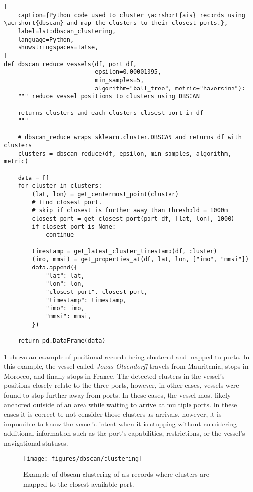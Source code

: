 \begin{lstlisting}[
    caption={Python code used to cluster \acrshort{ais} records using \acrshort{dbscan} and map the clusters to their closest ports.},
    label=lst:dbscan_clustering,
    language=Python,
    showstringspaces=false,
]
def dbscan_reduce_vessels(df, port_df,
                          epsilon=0.00001095,
                          min_samples=5,
                          algorithm="ball_tree", metric="haversine"):
    """ reduce vessel positions to clusters using DBSCAN

    returns clusters and each clusters closest port in df
    """

    # dbscan_reduce wraps sklearn.cluster.DBSCAN and returns df with clusters
    clusters = dbscan_reduce(df, epsilon, min_samples, algorithm, metric)

    data = []
    for cluster in clusters:
        (lat, lon) = get_centermost_point(cluster)
        # find closest port.
        # skip if closest is further away than threshold = 1000m
        closest_port = get_closest_port(port_df, [lat, lon], 1000)
        if closest_port is None:
            continue

        timestamp = get_latest_cluster_timestamp(df, cluster)
        (imo, mmsi) = get_properties_at(df, lat, lon, ["imo", "mmsi"])
        data.append({
            "lat": lat,
            "lon": lon,
            "closest_port": closest_port,
            "timestamp": timestamp,
            "imo": imo,
            "mmsi": mmsi,
        })

    return pd.DataFrame(data)
\end{lstlisting}

\cref{fig:dbscan_clustering} shows an example of positional records being clustered and mapped to ports. In this example, the vessel called \textit{Jonas Oldendorff} travels from Mauritania, stops in Morocco, and finally stops in France. The detected clusters in the vessel's positions closely relate to the three ports, however, in other cases, vessels were found to stop further away from ports. In these cases, the vessel most likely anchored outside of an area while waiting to arrive at multiple ports. In these cases it is correct to not consider those clusters as arrivals, however, it is impossible to know the vessel's intent when it is stopping without considering additional information such as the port's capabilities, restrictions, or the vessel's navigational statuses.

\begin{figure}[htbp]
    \centering
    \texttt{[image: figures/dbscan/clustering]}
    \caption{Example of \acrshort{dbscan} clustering of \acrshort{ais} records where clusters are mapped to the closest available port.}
    \label{fig:dbscan_clustering}
\end{figure}

